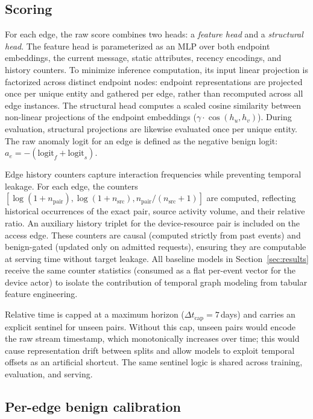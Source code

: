 \subsection{Scoring}

For each edge, the raw score combines two heads: a \textit{feature head} and a \textit{structural head}.
The feature head is parameterized as an MLP over both endpoint embeddings, the current message,
static attributes, recency encodings, and history counters. To minimize inference computation,
its input linear projection is factorized across distinct endpoint nodes: endpoint representations
are projected once per unique entity and gathered per edge, rather than recomputed across all edge
instances. The structural head computes a scaled cosine similarity between non-linear projections
of the endpoint embeddings ($\gamma \cdot \cos(h_u, h_v)$). During evaluation, structural projections
are likewise evaluated once per unique entity. The raw anomaly logit for an edge is defined as the
negative benign logit: $a_e = -(\text{logit}_f + \text{logit}_s)$.

Edge history counters capture interaction frequencies while preventing temporal leakage.
For each edge, the counters $[\log(1{+}n_{\text{pair}}), \log(1{+}n_{\text{src}}),
n_{\text{pair}}/(n_{\text{src}}{+}1)]$ are computed, reflecting historical occurrences of the exact pair,
source activity volume, and their relative ratio. An auxiliary history triplet for the device-resource
pair is included on the access edge. These counters are causal (computed strictly from past events)
and benign-gated (updated only on admitted requests), ensuring they are computable at serving time
without target leakage. All baseline models in Section~\ref{sec:results} receive the same counter
statistics (consumed as a flat per-event vector for the device actor) to isolate the contribution
of temporal graph modeling from tabular feature engineering.

Relative time is capped at a maximum horizon ($\Delta t_{\text{cap}} = 7$\,days) and carries an
explicit sentinel for unseen pairs. Without this cap, unseen pairs would encode the raw stream
timestamp, which monotonically increases over time; this would cause representation drift between
splits and allow models to exploit temporal offsets as an artificial shortcut. The same sentinel
logic is shared across training, evaluation, and serving.

\subsection{Per-edge benign calibration}
\label{sec:edge-calib}

